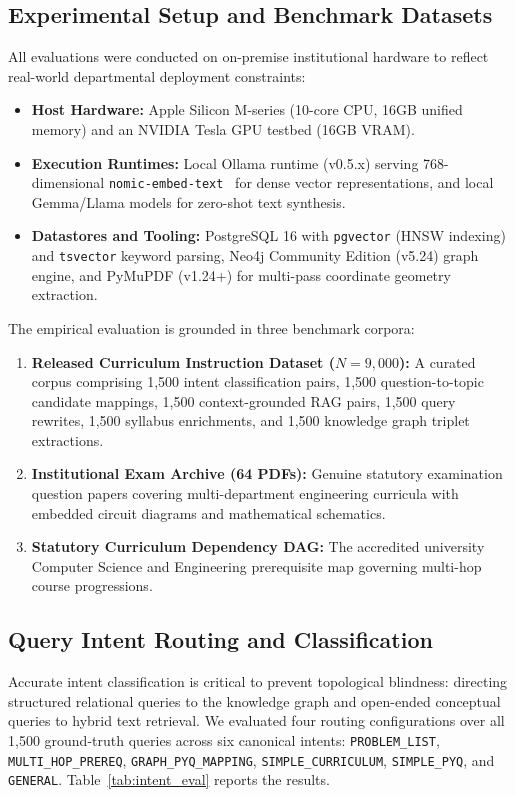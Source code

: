\documentclass[conference]{IEEEtran}
\begin{document}
\subsection{Experimental Setup and Benchmark Datasets}
All evaluations were conducted on on-premise institutional hardware to reflect real-world departmental deployment constraints:
\begin{itemize}
    \item \textbf{Host Hardware:} Apple Silicon M-series (10-core CPU, 16GB unified memory) and an NVIDIA Tesla GPU testbed (16GB VRAM).
    \item \textbf{Execution Runtimes:} Local Ollama runtime (v0.5.x) serving 768-dimensional \texttt{nomic-embed-text}~\cite{nussbaum2024} for dense vector representations, and local Gemma/Llama models for zero-shot text synthesis.
    \item \textbf{Datastores and Tooling:} PostgreSQL 16 with \texttt{pgvector} (HNSW indexing) and \texttt{tsvector} keyword parsing, Neo4j Community Edition (v5.24) graph engine, and PyMuPDF (v1.24+) for multi-pass coordinate geometry extraction.
\end{itemize}

The empirical evaluation is grounded in three benchmark corpora:
\begin{enumerate}
    \item \textbf{Released Curriculum Instruction Dataset ($N = 9{,}000$):} A curated corpus comprising 1,500 intent classification pairs, 1,500 question-to-topic candidate mappings, 1,500 context-grounded RAG pairs, 1,500 query rewrites, 1,500 syllabus enrichments, and 1,500 knowledge graph triplet extractions.
    \item \textbf{Institutional Exam Archive (64 PDFs):} Genuine statutory examination question papers covering multi-department engineering curricula with embedded circuit diagrams and mathematical schematics.
    \item \textbf{Statutory Curriculum Dependency DAG:} The accredited university Computer Science and Engineering prerequisite map governing multi-hop course progressions.
\end{enumerate}

\subsection{Query Intent Routing and Classification}
Accurate intent classification is critical to prevent topological blindness: directing structured relational queries to the knowledge graph and open-ended conceptual queries to hybrid text retrieval. We evaluated four routing configurations over all 1,500 ground-truth queries across six canonical intents: \texttt{PROBLEM\_LIST}, \texttt{MULTI\_HOP\_PREREQ}, \texttt{GRAPH\_PYQ\_MAPPING}, \texttt{SIMPLE\_CURRICULUM}, \texttt{SIMPLE\_PYQ}, and \texttt{GENERAL}. Table~\ref{tab:intent_eval} reports the results.
\end{document}
